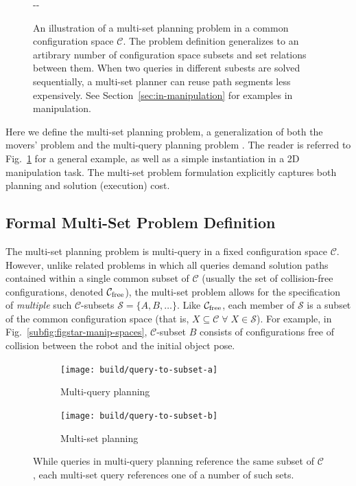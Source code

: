 \documentclass{report}
\newlength{\offsetpage}
\newenvironment{widepage}
   {\begin{adjustwidth}{-\offsetpage}{-\offsetpage}%
    \addtolength{\textwidth}{2\offsetpage}}%
{\end{adjustwidth}}
\begin{document}
\begin{figure}
\begin{widepage}
\caption{An illustration of a multi-set planning
  problem in a common configuration space $\mathcal{C}$.
  The problem definition generalizes to an artibrary number of
  configuration space subsets and set relations between them.
  When two queries in different subests are solved sequentially,
  a multi-set planner can reuse path segments less expensively.
  See Section~\ref{sec:in-manipulation} for examples in
  manipulation.}
\label{fig:multi-set}
\end{widepage}
\end{figure}

Here we define the multi-set planning problem,
a generalization of both the movers' problem
and the multi-query planning problem
\cite{kavrakietal1996prm}.
The reader is referred to
Fig.~\ref{fig:multi-set}
for a general example,
as well as a simple instantiation in a 2D manipulation task.
The multi-set problem formulation
explicitly captures both planning and
solution (execution) cost.

\subsection{Formal Multi-Set Problem Definition}
\label{subsec:problem-definition}

The multi-set planning problem is multi-query in
a fixed configuration space $\mathcal{C}$.
However, unlike related problems in which all
queries demand solution paths contained within a single common subset of
$\mathcal{C}$
(usually the set of collision-free configurations, denoted
$\mathcal{C}_{\mbox{\scriptsize free}}$),
the multi-set problem allows for the specification of
\emph{multiple} such $\mathcal{C}$-subsets
$\mathcal{S} = \{ A, B, \dots \}$.
Like $\mathcal{C}_{\mbox{\scriptsize free}}$,
each member of $\mathcal{S}$
is a subset of the common configuration space
(that is,
$X \subseteq \mathcal{C} \;\forall\; X \in \mathcal{S}$).
For example, in Fig.~\ref{subfig:figstar-manip-spaces},
$\mathcal{C}$-subset $B$
consists of configurations
free of collision between the robot and
the initial object pose.

\begin{figure}
\centering
\begin{subfigure}[t]{0.45\linewidth}
\centering
\texttt{[image: build/query-to-subset-a]}
\caption{Multi-query planning}
\end{subfigure}%
\quad\quad%
\begin{subfigure}[t]{0.45\linewidth}
\centering
\texttt{[image: build/query-to-subset-b]}
\caption{Multi-set planning}
\end{subfigure}
\caption{While queries in multi-query planning reference
  the same subset of $\mathcal{C}$,
  each multi-set query references one of a number of such sets.}
\label{fig:query-to-subset}
\end{figure}
\end{document}
